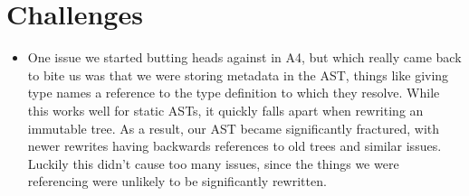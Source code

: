 \documentclass{article}
\begin{document}
\section{Challenges}
\begin{itemize}
    \item One issue we started butting heads against in A4, but which really came back to bite us was that we were
        storing metadata in the AST, things like giving type names a reference to the type definition to which they
        resolve. While this works well for static ASTs, it quickly falls apart when rewriting an immutable tree. As a
        result, our AST became significantly fractured, with newer rewrites having backwards references to old trees and
        similar issues. Luckily this didn't cause too many issues, since the things we were referencing were unlikely to
        be significantly rewritten.


\end{itemize}
\end{document}
